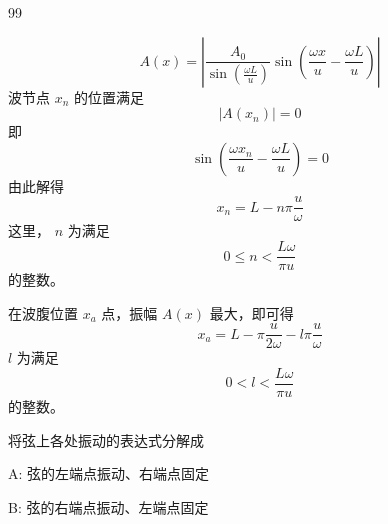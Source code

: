 \begin{solution}{99}
\begin{subsolution}
\begin{subsubsolution}
            \begin{equation*}
                A (x) = \left| \frac {A _ {0}}{\sin \left(\frac {\omega L}{u}\right)} \sin \left(\frac {\omega x}{u} - \frac {\omega L}{u}\right) \right|
            \end{equation*}
            波节点 $x_{n}$ 的位置满足
            \begin{equation*}
                \left| A (x _ {n}) \right| = 0
            \end{equation*}
            即
            \begin{equation*}
                \sin \left(\frac {\omega x _ {n}}{u} - \frac {\omega L}{u}\right) = 0
            \end{equation*}
            由此解得
            \begin{equation}
                x _ {n} = L - n \pi \frac {u}{\omega}
                \label{eq:11.p99}
            \end{equation}
            这里， $n$ 为满足
            \begin{equation}
                0 \leq n <   \frac {L \omega}{\pi u}
                \label{eq:12.p99}
            \end{equation}
            的整数。

            在波腹位置 $x_{a}$ 点，振幅 $A(x)$ 最大，即可得
            \begin{equation}
                x _ {a} = L - \pi \frac {u}{2 \omega} - l \pi \frac {u}{\omega}
                \label{eq:13.p99}
            \end{equation}
            $l$ 为满足
            \begin{equation}
                0 <   l <   \frac {L \omega}{\pi u}
                \label{eq:14.p99}
            \end{equation}
            的整数。
        \end{subsubsolution}
    \end{subsolution}
    \begin{subsolution}
        将弦上各处振动的表达式分解成

        A: 弦的左端点振动、右端点固定

        B: 弦的右端点振动、左端点固定


\end{subsolution}
\end{solution}
